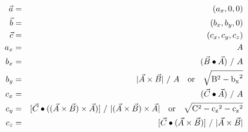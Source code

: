 \documentclass[12pt]{article}
\begin{document}
\begin{eqnarray*}
\vec{a} &=& (a_x,0,0) \\
\vec{b} &=& (b_x,b_y,0) \\
\vec{c} &=& (c_x,c_y,c_z) \\
a_x &=& A \\
b_x &=& (\vec{B} \bullet \vec{A}) \,\, / \,\, A \\
b_y &=& |\vec{A} \times \vec{B}| \,\, / \,\, A \quad \rm{or} \quad  \sqrt{B^2 - {b_x}^2} \\
c_x &=& (\vec{C} \bullet \vec{A}) \,\, / \,\, A \\
c_y &=& [\vec{C} \bullet ((\vec{A} \times \vec{B}) \times \vec{A})] \,\, / \,\, |(\vec{A} \times \vec{B}) \times \vec{A}| \quad \rm{or} \quad \sqrt{C^2 - {c_z}^2 -{c_z}^2} \\
c_z &=& [\vec{C} \bullet (\vec{A} \times \vec{B})] \,\, / \,\, |\vec{A} \times \vec{B}| \\
\end{eqnarray*}
\end{document}
